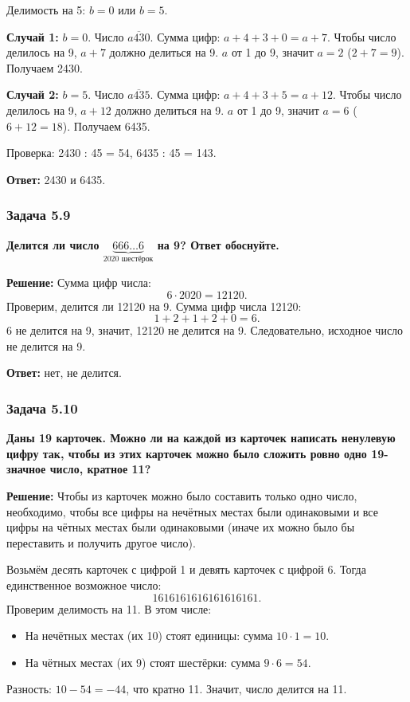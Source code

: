 \documentclass[12pt, a4paper]{article}
\begin{document}
Делимость на 5: $b = 0$ или $b = 5$.

\textbf{Случай 1:} $b = 0$. Число $\overline{a430}$. Сумма цифр: $a + 4 + 3 + 0 = a + 7$. Чтобы число делилось на 9, $a + 7$ должно делиться на 9. $a$ от 1 до 9, значит $a = 2$ ($2+7=9$). Получаем 2430.

\textbf{Случай 2:} $b = 5$. Число $\overline{a435}$. Сумма цифр: $a + 4 + 3 + 5 = a + 12$. Чтобы число делилось на 9, $a + 12$ должно делиться на 9. $a$ от 1 до 9, значит $a = 6$ ($6+12=18$). Получаем 6435.

Проверка: 2430 : 45 = 54, 6435 : 45 = 143.

\textbf{Ответ:} 2430 и 6435.

\subsubsection*{Задача 5.9}
\textbf{Делится ли число $\underbrace{666\ldots6}_{2020\text{ шестёрок}}$ на 9? Ответ обоснуйте.}

\textbf{Решение:}
Сумма цифр числа:
\[
6 \cdot 2020 = 12120.
\]
Проверим, делится ли 12120 на 9. Сумма цифр числа 12120:
\[
1 + 2 + 1 + 2 + 0 = 6.
\]
6 не делится на 9, значит, 12120 не делится на 9. Следовательно, исходное число не делится на 9.

\textbf{Ответ:} нет, не делится.

\subsubsection*{Задача 5.10}
\textbf{Даны 19 карточек. Можно ли на каждой из карточек написать ненулевую цифру так, чтобы из этих карточек можно было сложить ровно одно 19-значное число, кратное 11?}

\textbf{Решение:}
Чтобы из карточек можно было составить только одно число, необходимо, чтобы все цифры на нечётных местах были одинаковыми и все цифры на чётных местах были одинаковыми (иначе их можно было бы переставить и получить другое число).

Возьмём десять карточек с цифрой 1 и девять карточек с цифрой 6. Тогда единственное возможное число:
\[
1616161616161616161.
\]
Проверим делимость на 11. В этом числе:
\begin{itemize}
    \item На нечётных местах (их 10) стоят единицы: сумма $10 \cdot 1 = 10$.
    \item На чётных местах (их 9) стоят шестёрки: сумма $9 \cdot 6 = 54$.
\end{itemize}
Разность: $10 - 54 = -44$, что кратно 11. Значит, число делится на 11.
\end{document}
